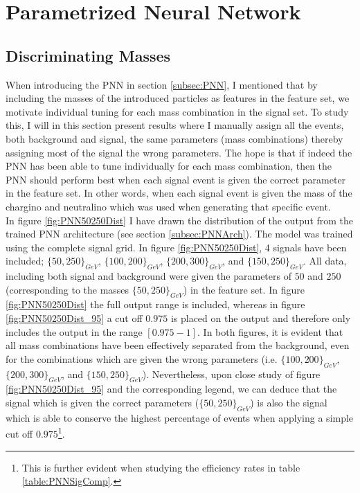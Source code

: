 \section{Parametrized Neural Network}
\subsection{Discriminating Masses}
When introducing the \ac{PNN} in section \ref{subsec:PNN}, I mentioned that by including the masses of the introduced particles as features 
in the feature set, we motivate individual tuning for each mass combination in the signal set. To study this, I will in this section 
present results where I manually assign all the events, both background and signal, the same parameters (mass combinations) thereby assigning 
most of the signal the wrong parameters. The hope is that if indeed the \ac{PNN} has been able to tune individually for each mass combination, 
then the \ac{PNN} should perform best when each signal event is given the correct parameter in the feature set. In other words, when each signal 
event is given the mass of the chargino and neutralino which was used when generating that specific event.
\\
In figure \ref{fig:PNN50250Dist} I have drawn the distribution of the output from the trained \ac{PNN} architecture 
(see section \ref{subsec:PNNArch}). The model was trained using the complete signal grid. In figure \ref{fig:PNN50250Dist},
4 signals have been included; $\{50,250\}_{GeV}$, $\{100,200\}_{GeV}$, $\{200,300\}_{GeV}$, and $\{150,250\}_{GeV}$. All data, including 
both signal and background were given the parameters of $50$ and $250$ (corresponding to the masses $\{50,250\}_{GeV}$) in the feature set. 
In figure \ref{fig:PNN50250Dist} the full output range is included, whereas in figure \ref{fig:PNN50250Dist_95} a cut off $0.975$ is placed on the 
output and therefore only includes the output in the range $[0.975-1]$. In both figures, it is evident that all mass combinations have been 
effectively separated from the background, even for the combinations which are given the wrong parameters (i.e. $\{100,200\}_{GeV}$, $\{200,300\}_{GeV}$, 
and $\{150,250\}_{GeV}$). Nevertheless, upon close study of figure \ref{fig:PNN50250Dist_95} and the corresponding legend, we can deduce that the signal 
which is given the correct parameters ($\{50,250\}_{GeV}$) is also the signal which is able to conserve the highest percentage of events when applying a 
simple cut off $0.975$\footnote{This is further evident when studying the efficiency rates in table \ref{table:PNNSigComp}.}.\\
